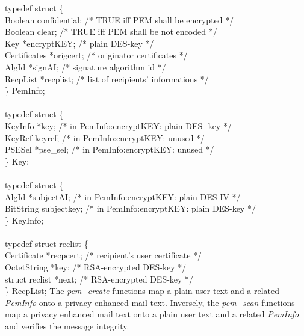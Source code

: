 {\small
\bvtab
typedef struct \{ \\
\1   Boolean     \4  confidential;\3 /* TRUE iff PEM shall be encrypted */ 
\\
\1   Boolean     \4  clear;       \3 /* TRUE iff PEM shall be not encoded 
*/ \\
\1   Key         \4 *encryptKEY;  \3 /* plain DES-key */ \\
\1   Certificates\4 *origcert;    \3 /* originator certificates */ \\
\1   AlgId       \4 *signAI;      \3 /* signature algorithm id */ \\
\1   RecpList    \4 *recplist;    \3  /* list of recipients' informations 
*/ \\
  \} PemInfo; \\ \\

typedef struct \{ \\
\1   KeyInfo     \4 *key;         \3 /* in PemInfo:encryptKEY: plain DES-
key */ \\
\1   KeyRef      \4  keyref;      \3 /* in PemInfo:encryptKEY: unused */ \\
\1   PSESel      \4 *pse\_sel;    \3 /* in PemInfo:encryptKEY: unused */ \\
  \} Key; \\ \\

typedef struct \{  \\
\1   AlgId       \4 *subjectAI;   \3 /* in PemInfo:encryptKEY: plain DES-IV 
*/ \\
\1   BitString   \4 subjectkey;  \3 /* in PemInfo:encryptKEY: plain DES-key 
*/ \\
   \} KeyInfo; \\ \\

typedef struct reclist \{ \\
\1   Certificate \4 *recpcert;    \3 /* recipient's user certificate */ \\
\1   OctetString \4 *key;         \3 /* RSA-encrypted DES-key */ \\
\1   struct reclist \4 *next;     \3 /* RSA-encrypted DES-key */ \\
   \} RecpList;
\etab
}
The {\em pem\_create} functions map
a plain user text and a related {\em PemInfo} onto
a privacy enhanced mail text.
Inversely, the {\em pem\_scan} functions map
a privacy enhanced mail text onto
a plain user text and a related {\em PemInfo}
and verifies the message integrity.
